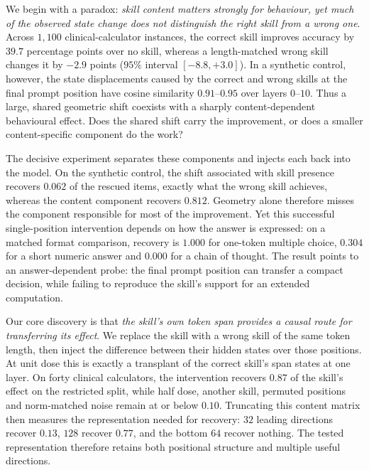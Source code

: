 \documentclass{article}
\begin{document}
We begin with a paradox: \emph{skill content matters strongly for behaviour,
yet much of the observed state change does not distinguish the right skill from
a wrong one}. Across $1{,}100$ clinical-calculator instances, the correct skill
improves accuracy by $39.7$ percentage points over no skill, whereas a
length-matched wrong skill changes it by $-2.9$ points ($95\%$ interval
$[-8.8,+3.0]$). In a synthetic control, however, the state displacements caused
by the correct and wrong skills at the final prompt position have cosine
similarity $0.91$--$0.95$ over layers $0$--$10$. Thus a large, shared geometric
shift coexists with a sharply content-dependent behavioural effect. Does the
shared shift carry the improvement, or does a smaller content-specific component
do the work?

The decisive experiment separates these components and injects each back into
the model. On the synthetic control, the shift associated with skill presence
recovers $0.062$ of the rescued items, exactly what the wrong skill achieves,
whereas the content component recovers $0.812$. Geometry alone therefore misses
the component responsible for most of the improvement. Yet this successful
single-position intervention depends on how the answer is expressed: on a
matched format comparison, recovery is $1.000$ for one-token multiple choice,
$0.304$ for a short numeric answer and $0.000$ for a chain of thought. The
result points to an answer-dependent probe: the final prompt position can
transfer a compact decision, while failing to reproduce the skill's support for
an extended computation.

Our core discovery is that \emph{the skill's own token span provides a causal
route for transferring its effect}. We replace the skill with a wrong skill of
the same token length, then inject the difference between their hidden states
over those positions. At unit dose this is exactly a transplant of the correct
skill's span states at one layer. On forty clinical calculators, the intervention
recovers $0.87$ of the skill's effect on the restricted split, while half dose,
another skill, permuted positions and norm-matched noise remain at or below
$0.10$. Truncating this content matrix then measures the representation needed
for recovery: $32$ leading directions recover $0.13$, $128$ recover $0.77$, and
the bottom $64$ recover nothing. The tested representation therefore retains
both positional structure and multiple useful directions.
\end{document}
